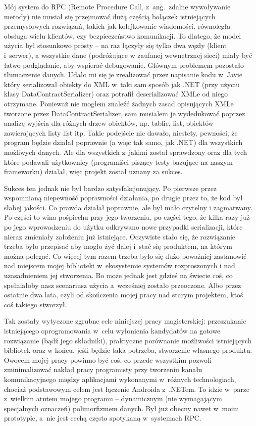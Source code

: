 Mój system do RPC (Remote Procedure Call, z~ang.\ zdalne wywoływanie metody) nie musiał się przejmować dużą częścią bolączek istniejących przemysłowych rozwiązań, takich jak kolejkowanie wiadomości, równoległa obsługa wielu klientów, czy bezpieczeństwo komunikacji. To dlatego, że model użycia był stosunkowo prosty -- na raz łączyły się tylko dwa węzły (klient i~serwer), a wszystkie dane (podróżujące w zaufanej wewnętrznej sieci) miały być łatwo podglądanie, aby wspierać debugowanie. Głównym problemem pozostało tłumaczenie danych. Udało mi się je zrealizować przez napisanie kodu w~Javie który serializował obiekty do XML w~taki sam sposób jak .NET (przy użyciu klasy DataContractSerializer) oraz potrafił deserializować XMLe od niego otrzymane. Ponieważ nie mogłem znaleźć żadnych zasad opisujących XMLe tworzone przez DataContractSerializer, sam musiałem je wydedukować poprzez analizę wyjścia dla różnych drzew obiektów, np. tablic, list, obiektów zawierających listy list itp. Takie podejście nie dawało, niestety, pewności, że program będzie działał poprawnie (a więc tak samo, jak .NET) dla wszystkich możliwych danych. Ale dla wszystkich z~jakimi został sprawdzony oraz dla tych które podawali użytkownicy (programiści piszący testy bazujące na naszym frameworku) działał, więc projekt został uznany za sukces.

Sukces ten jednak nie był bardzo satysfakcjonujący. Po pierwsze przez wspomnianą niepewność poprawności działania, po drugie przez to, że kod był słabej jakości. Co prawda działał poprawnie, ale był mało czytelny i zagmatwany. Po części to wina pośpiechu przy jego tworzeniu, po części tego, że kilka razy już po jego wprowadzeniu do użytku odkrywano nowe przypadki serializacji, które nieraz zmieniały założeniu już istniejące. Oczywiste stało się, że rozwiązanie trzeba było przepisać aby mogło żyć dalej i~stać się produktem, na którym można polegać. Co więcej tym razem trzeba było się dużo poważniej zastanowić nad miejscem mojej biblioteki w~ekosystemie systemów rozproszonych i nad uzasadnieniem jej stworzenia. Bo może jednak jest gdzieś na świecie coś, co spełniałoby nasz scenariusz użycia a~wcześniej zostało przeoczone. Albo przez ostatnie dwa lata, czyli od skończenia mojej pracy nad starym projektem, ktoś coś takiego stworzył.

Tak zostały wytyczone zgrubne cele niniejszej pracy magisterskiej: przeszukanie istniejącego oprogramowania w~celu wyłonienia kandydatów na gotowe rozwiązanie (bądź jego składniki), praktyczne porównanie możliwości istniejących bibliotek oraz w końcu, jeśli będzie taka potrzeba, stworzenie własnego produktu. Owocem mojej pracy powinno być coś, co przede wszystkim pozwoli zminimalizować nakład pracy programisty przy tworzeniu kanału komunikacyjnego między aplikacjami wykonanymi w~różnych technologiach, chociaż podstawowym celem jest łączenie Androida z~.NETem. To idzie w~parze z~wielkim atutem mojego programu -- dynamicznym (nie wymagającym specjalnych oznaczeń) polimorfizmem danych. Był już obecny nawet w~moim prototypie, a~nie jest cechą często spotykaną w~systemach RPC.

